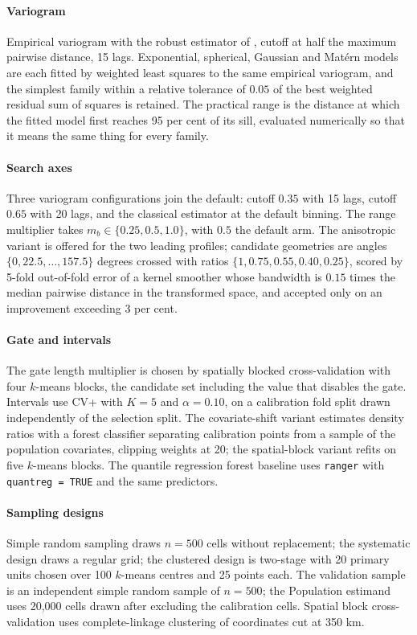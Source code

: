 \documentclass[preprint,12pt,authoryear]{elsarticle}
\begin{document}
\paragraph{Variogram} Empirical variogram with the robust estimator of
\citet{cressie1980}, cutoff at half the maximum pairwise distance, 15 lags.
Exponential, spherical, Gaussian and Mat\'ern models are each fitted by weighted
least squares to the same empirical variogram, and the simplest family within a
relative tolerance of $0.05$ of the best weighted residual sum of squares is
retained. The practical range is the distance at which the fitted model first
reaches 95 per cent of its sill, evaluated numerically so that it means the same
thing for every family.

\paragraph{Search axes} Three variogram configurations join the default: cutoff
$0.35$ with 15 lags, cutoff $0.65$ with 20 lags, and the classical
\citet{matheron1963} estimator at the default binning. The range multiplier
takes $m_b \in \{0.25,0.5,1.0\}$, with $0.5$ the default arm. The anisotropic
variant is offered for the two leading profiles; candidate geometries are angles
$\{0,22.5,\dots,157.5\}$ degrees crossed with ratios
$\{1,0.75,0.55,0.40,0.25\}$, scored by 5-fold out-of-fold error of a kernel
smoother whose bandwidth is $0.15$ times the median pairwise distance in the
transformed space, and accepted only on an improvement exceeding 3 per cent.

\paragraph{Gate and intervals} The gate length multiplier is chosen by spatially
blocked cross-validation with four $k$-means blocks, the candidate set including
the value that disables the gate. Intervals use CV+ with $K=5$ and
$\alpha=0.10$, on a calibration fold split drawn independently of the selection
split. The covariate-shift variant estimates density ratios with a forest
classifier separating calibration points from a sample of the population
covariates, clipping weights at 20; the spatial-block variant refits on five
$k$-means blocks. The quantile regression forest baseline uses \texttt{ranger}
with \texttt{quantreg = TRUE} and the same predictors.

\paragraph{Sampling designs} Simple random sampling draws $n=500$ cells without
replacement; the systematic design draws a regular grid; the clustered design is
two-stage with 20 primary units chosen over 100 $k$-means centres and 25 points
each. The validation sample is an independent simple random sample of $n=500$;
the Population estimand uses 20{,}000 cells drawn after excluding the
calibration cells. Spatial block cross-validation uses complete-linkage
clustering of coordinates cut at 350 km.
\end{document}
